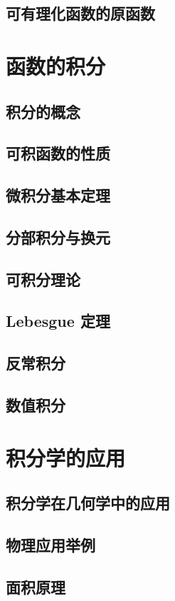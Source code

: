 \documentclass[a4paper, 11pt]{ctexbook}
\begin{document}
        \section{可有理化函数的原函数}
    \chapter{函数的积分}
        \section{积分的概念}
        \section{可积函数的性质}
        \section{微积分基本定理}
        \section{分部积分与换元}
        \section{可积分理论}
            
        \section{Lebesgue 定理}
        \section{反常积分}
        \section{数值积分}
    \chapter{积分学的应用}
        \section{积分学在几何学中的应用}
        \section{物理应用举例}
        \section{面积原理}
\end{document}
